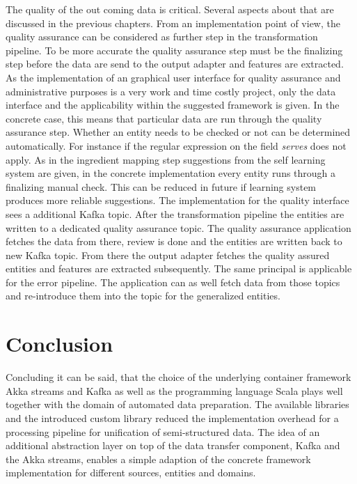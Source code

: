 The quality of the out coming data is critical. Several aspects about that are discussed in the previous chapters. From an implementation point of view, the quality assurance can be considered as further step in the transformation pipeline. To be more accurate the quality assurance step must be the finalizing step before the data are send to the output adapter and features are extracted.
As the implementation of an graphical user interface for quality assurance and administrative purposes is a very work and time costly project, only the data interface and the applicability within the suggested framework is given. 
In the concrete case, this means that particular data are run through the quality assurance step. Whether an entity needs to be checked or not can be determined automatically. For instance if the regular expression on the field \textit{serves} does not apply. As in the ingredient mapping step suggestions from the self learning system are given, in the concrete implementation every entity runs through a finalizing manual check. This can be reduced in future if learning system produces more reliable suggestions. 
The implementation for the quality interface sees a additional Kafka topic. After the transformation pipeline the entities are written to a dedicated quality assurance topic. The quality assurance application fetches the data from there, review is done and the entities are written back to new Kafka topic. From there the output adapter fetches the quality assured entities and features are extracted subsequently. The same principal is applicable for the error pipeline. The application can as well fetch data from those topics and re-introduce them into the topic for the generalized entities.

\section{Conclusion}

Concluding it can be said, that the choice of the underlying container framework Akka streams and Kafka as well as the programming language Scala plays well together with the domain of automated data preparation. The available libraries and the introduced custom library reduced the implementation overhead for a processing pipeline for unification of semi-structured data. The idea of an additional abstraction layer on top of the data transfer component, Kafka and the Akka streams, enables a simple adaption of the concrete framework implementation for different sources, entities and domains.
